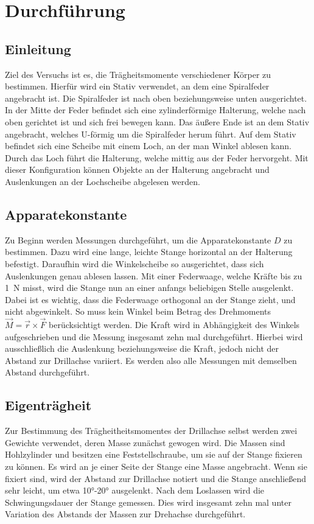 \section{Durchführung}
\label{sec:Durchführung}

\subsection{Einleitung}
Ziel des Versuchs ist es, die Trägheitsmomente verschiedener Körper zu bestimmen. Hierfür wird ein Stativ verwendet, an dem eine Spiralfeder angebracht ist.
Die Spiralfeder ist nach oben beziehungsweise unten ausgerichtet. In der Mitte der Feder befindet sich eine zylinderförmige Halterung, welche nach oben gerichtet ist und sich frei bewegen kann.
Das äußere Ende ist an dem Stativ angebracht, welches U-förmig um die Spiralfeder herum führt. Auf dem Stativ befindet sich eine Scheibe mit einem Loch, an der man Winkel ablesen kann.
Durch das Loch führt die Halterung, welche mittig aus der Feder hervorgeht. Mit dieser Konfiguration können Objekte an der Halterung angebracht und Auslenkungen an 
der Lochscheibe abgelesen werden.

\subsection{Apparatekonstante}
Zu Beginn werden Messungen durchgeführt, um die Apparatekonstante $D$ zu bestimmen.
Dazu wird eine lange, leichte Stange horizontal an der Halterung befestigt. Daraufhin wird die Winkelscheibe so ausgerichtet, dass sich Auslenkungen genau ablesen lassen.
Mit einer Federwaage, welche Kräfte bis zu \SI{1}{\newton} misst, wird die Stange nun an einer anfangs beliebigen Stelle ausgelenkt. Dabei ist es wichtig, dass die Federwaage
orthogonal an der Stange zieht, und nicht abgewinkelt. So muss kein Winkel beim Betrag des Drehmoments $\vec{M}=\vec{r}\times\vec{F}$ berücksichtigt werden.  
Die Kraft wird in Abhängigkeit des Winkels aufgeschrieben und
die Messung insgesamt zehn mal durchgeführt.
Hierbei wird ausschließlich die Auslenkung beziehungsweise die Kraft, jedoch nicht der Abstand zur Drillachse variiert. Es werden also alle Messungen mit demselben Abstand durchgeführt.

\subsection{Eigenträgheit}
Zur Bestimmung des Trägheitheitsmomentes der Drillachse selbst werden zwei Gewichte verwendet, deren Masse zunächst gewogen wird.
Die Massen sind Hohlzylinder und besitzen eine Feststellschraube, um sie auf der Stange fixieren zu können.
Es wird an je einer Seite der Stange eine Masse angebracht. Wenn sie fixiert sind, wird der Abstand zur Drillachse notiert und die Stange anschließend sehr leicht,
um etwa \ang{10;;}-\ang{20;;} ausgelenkt. Nach dem Loslassen wird die Schwingungsdauer der Stange gemessen.
Dies wird insgesamt zehn mal unter Variation des Abstands der Massen zur Drehachse durchgeführt.

